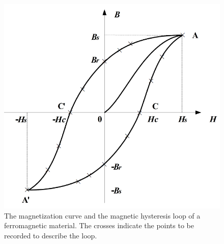 \documentclass[12pt]{article}
\begin{document}
\begin{figure}[H]
\centering
\includegraphics[scale=0.3]{P2.jpg}
\caption{The magnetization curve and the magnetic hysteresis loop of a ferromagnetic
material. The crosses indicate the points to be recorded to describe the loop.}
\end{figure}
\end{document}
